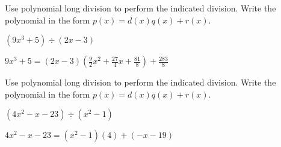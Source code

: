 \documentclass{ximera}
\begin{document}
\begin{problem}
Use polynomial long division to perform the indicated division.  Write the polynomial in the form $p(x) = d(x)q(x) + r(x)$.

$\left(9x^{3} + 5 \right) \div \left(2x - 3 \right)$

\begin{solution}
$9x^{3} + 5 =(2x - 3) \left(\frac{9}{2}x^{2} + \frac{27}{4}x + \frac{81}{8} \right) + \frac{283}{8}$
\end{solution}
\end{problem} 

\begin{problem}\label{longpolydivreviewlast}
Use polynomial long division to perform the indicated division.  Write the polynomial in the form $p(x) = d(x)q(x) + r(x)$.

$\left(4x^2 - x - 23 \right) \div \left(x^{2} - 1 \right)$ 

\begin{solution}
$4x^2 - x - 23 = \left(x^{2} - 1 \right)(4) + (-x - 19)$
\end{solution}

\end{problem}  
\end{document}
